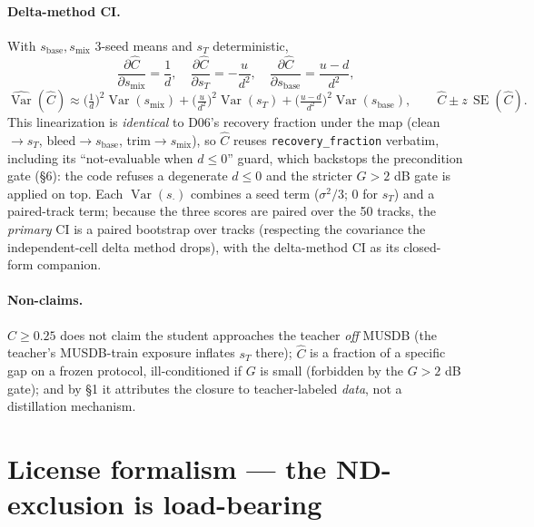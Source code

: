 \documentclass[11pt]{article}
\newcommand{\code}[1]{\texttt{#1}}
\DeclareMathOperator{\Var}{Var}
\DeclareMathOperator{\SE}{SE}
\newcommand{\sbase}{s_{\text{base}}}
\newcommand{\smix}{s_{\text{mix}}}
\newcommand{\sT}{s_T}
\newcommand{\Chat}{\hat C}
\begin{document}
\paragraph{Delta-method CI.} With $\sbase,\smix$ 3-seed means and $\sT$ deterministic,
\[
\frac{\partial\Chat}{\partial\smix}=\frac1d,\quad
\frac{\partial\Chat}{\partial\sT}=-\frac{u}{d^2},\quad
\frac{\partial\Chat}{\partial\sbase}=\frac{u-d}{d^2},
\]
\[
\widehat{\Var}(\Chat)\approx\Big(\tfrac1d\Big)^2\Var(\smix)+\Big(\tfrac{u}{d^2}\Big)^2\Var(\sT)
+\Big(\tfrac{u-d}{d^2}\Big)^2\Var(\sbase),\qquad \Chat\pm z\,\SE(\Chat).
\]
This linearization is \emph{identical} to D06's recovery fraction under the map (clean$\to\sT$,
bleed$\to\sbase$, trim$\to\smix$), so $\Chat$ reuses \code{recovery\_fraction} verbatim, including
its ``not-evaluable when $d\le0$'' guard, which backstops the precondition gate (\S6): the code
refuses a degenerate $d\le0$ and the stricter $G>2$ dB gate is applied on top. Each $\Var(s_\cdot)$ combines
a seed term ($\sigma^2/3$; $0$ for $\sT$) and a paired-track term; because the three scores are
paired over the 50 tracks, the \emph{primary} CI is a paired bootstrap over tracks (respecting the
covariance the independent-cell delta method drops), with the delta-method CI as its closed-form
companion.

\paragraph{Non-claims.} $\Chat\ge0.25$ does not claim the student approaches the teacher \emph{off}
MUSDB (the teacher's MUSDB-train exposure inflates $\sT$ there); $\Chat$ is a fraction of a specific
gap on a frozen protocol, ill-conditioned if $G$ is small (forbidden by the $G>2$ dB gate); and by
\S1 it attributes the closure to teacher-labeled \emph{data}, not a distillation mechanism.

\section{License formalism --- the ND-exclusion is load-bearing}
\end{document}

